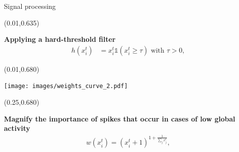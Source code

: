 \documentclass[final]{beamer}
\newenvironment{shaded2}{%
  \def\FrameCommand{\fboxsep=\FrameSep \colorbox{blue!20}}%
  \MakeFramed {\FrameRestore}}%
 {\endMakeFramed}
\begin{document}
\begin{frame}{}
\begin{textblock}{0.485}
\begin{block}{Signal processing \phantom{p}}
\begin{textblock}{0.485}
\begin{minipage}{0.48\linewidth}
\begin{shaded2}
\end{shaded2}
\end{minipage}
\end{textblock}

\begin{textblock}{0.485}(0.01,0.635)
\begin{minipage}{0.48\linewidth}
\begin{shaded2}
\vspace{7pt}
{\color{lightblue} \textbf{Applying a hard-threshold filter}}
\vspace{-5pt}
\begin{align*}
h(x^{t}_i) &= x^{t}_i \mathbb{1}(x^{t}_i \geq \tau) \text{ with } \tau > 0,
\end{align*}
\vspace{8pt}
\end{shaded2}
\end{minipage}
\end{textblock}


\begin{textblock}{0.485}(0.01,0.680)
\begin{minipage}{0.48\linewidth}
\begin{shaded}
\begin{center}
\texttt{[image: images/weights\_curve\_2.pdf]}
\end{center}
\vspace{-14pt}
\end{shaded}
\end{minipage}
\end{textblock}

\begin{textblock}{0.485}(0.25,0.680)
\begin{minipage}{0.48\linewidth}
\begin{shaded}
\vspace{15pt}
{\color{lightred} \textbf{Magnify the importance of spikes that occur in cases of low global activity}}
\begin{align*}
w(x^{t}_i) = (x^{t}_i + 1 )^{1 + \frac{1}{\sum_{j} x^{t}_j}},
\end{align*}\vspace{54pt}
\end{shaded}
\end{minipage}
\end{textblock}



\end{block}








\end{textblock}
\end{frame}
\end{document}
